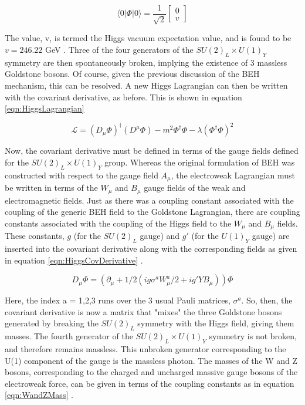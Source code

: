 \documentclass[12pt]{ucsddissertation}
\begin{document}
\begin{equation}\label{eqn:HiggsVEV}
	\langle 0 | \Phi | 0 \rangle = \frac{1}{\sqrt{2}} \begin{bmatrix} 0 \\ v \end{bmatrix}
\end{equation}

The value, v, is termed the Higgs vacuum expectation value, and is found to be $v = 246.22$ GeV \cite{PDGReview}. Three of the four generators of the $SU(2)_L \times U(1)_Y$ symmetry are then spontaneously broken, implying the existence of 3 massless Goldstone bosons. Of course, given the previous discussion of the BEH mechanism, this can be resolved. A new Higgs Lagrangian can then be written with the covariant derivative, as before. This is shown in equation \ref{eqn:HiggsLagrangian}

\begin{equation}\label{eqn:HiggsLagrangian}
    \mathcal{L} = (D_{\mu}\Phi)^{\dagger}(D^{\mu}\Phi) - m^2 \Phi^{\dagger} \Phi - \lambda (\Phi^{\dagger}\Phi)^2
\end{equation}

Now, the covariant derivative must be defined in terms of the gauge fields defined for the $SU(2)_L \times U(1)_Y$ group. Whereas the original formulation of BEH was constructed with respect to the gauge field $A_{\mu}$, the electroweak Lagrangian must be written in terms of the $W_{\mu}$ and $B_{\mu}$ gauge fields of the weak and electromagnetic fields. Just as there was a coupling constant associated with the coupling of the generic BEH field to the Goldstone Lagrangian, there are coupling constants associated with the coupling of the Higgs field to the $W_{\mu}$ and $B_{\mu}$ fields. These constants, $g$ (for the $SU(2)_L$ gauge) and $g'$ (for the $U(1)_Y$ gauge) are inserted into the covariant derivative along with the corresponding fields as given in equation \ref{eqn:HiggsCovDerivative} \cite{PDGReview}.

\begin{equation}\label{eqn:HiggsCovDerivative}
    D_{\mu}\Phi = (\partial_{\mu} + 1/2(i g \sigma^a W^{a}_{\mu}/2 + i g' Y B_{\mu}))\Phi
\end{equation}

Here, the index a = 1,2,3 runs over the 3 usual Pauli matrices, $\sigma^a$. So, then, the covariant derivative is now a matrix that "mixes" the three Goldstone bosons generated by breaking the $SU(2)_L$ symmetry with the Higgs field, giving them masses. The fourth generator of the $SU(2)_L \times U(1)_Y$ symmetry is not broken, and therefore remains massless. This unbroken generator corresponding to the U(1) component of the gauge is the massless photon. The masses of the W and Z bosons, corresponding to the charged and uncharged massive gauge bosons of the electroweak force, can be given in terms of the coupling constants as in equation \ref{eqn:WandZMass} \cite{PDGReview}.
\end{document}
